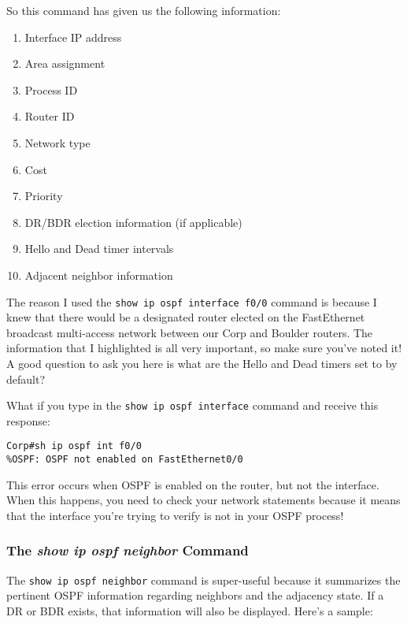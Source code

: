 So this command has given us the following information:

\begin{enumerate}
\tightlist
\item
  Interface IP address
\item
  Area assignment
\item
  Process ID
\item
  Router ID
\item
  Network type
\item
  Cost
\item
  Priority
\item
  \protect\hypertarget{c18.xhtmlux5cux23Page_769}{}{}DR/BDR election
  information (if applicable)
\item
  Hello and Dead timer intervals
\item
  Adjacent neighbor information
\end{enumerate}

The reason I used the \texttt{show\ ip\ ospf\ interface\ f0/0} command
is because I knew that there would be a designated router elected on the
FastEthernet broadcast multi-access network between our Corp and Boulder
routers. The information that I highlighted is all very important, so
make sure you've noted it! A good question to ask you here is what are
the Hello and Dead timers set to by default?

What if you type in the \texttt{show\ ip\ ospf\ interface} command and
receive this response:

\begin{verbatim}
Corp#sh ip ospf int f0/0
%OSPF: OSPF not enabled on FastEthernet0/0
\end{verbatim}

This error occurs when OSPF is enabled on the router, but not the
interface. When this happens, you need to check your network statements
because it means that the interface you're trying to verify is not in
your OSPF process!

\subsubsection[The \emph{show ip ospf neighbor}
Command]{\texorpdfstring{\protect\hypertarget{c18.xhtmlux5cux23c18-sec-15}{}{}The
\emph{show ip ospf neighbor}
Command}{The show ip ospf neighbor Command}}

The \texttt{show\ ip\ ospf\ neighbor} command is super-useful because it
summarizes the pertinent OSPF information regarding neighbors and the
adjacency state. If a DR or BDR exists, that information will also be
displayed. Here's a sample:

